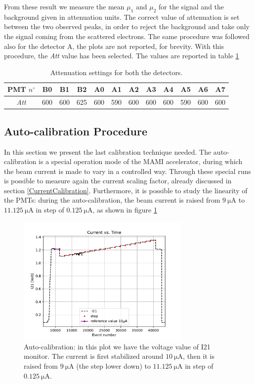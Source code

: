 From these result we measure the mean $\mu_{1}$ and $\mu_{2}$ for the signal and the background given in attenuation units. The correct value of attenuation is set between the two observed peaks, in order to reject the background and take only the signal coming from the scattered electrons. The same procedure was followed also for the detector A, the plots are not reported, for brevity.
With this procedure, the \textit{Att} value has been selected. The values are reported in table \ref{tab:AttSettings}

\begin{table}[ht]
\centering
\begin{tabular}{cccccccccccc}
PMT $n^{\circ}$& B0 & B1 & B2 & A0 & A1 & A2 & A3 & A4 & A5 & A6 & A7 \\
\hline
\textit{Att} & 600 & 600 & 625 & 600 & 590 & 600 & 600 & 600 & 590 & 600 & 600 \\
\end{tabular}
\caption{Attenuation settings for both the detectors.}
\label{tab:AttSettings}
\end{table}


\subsection{Auto-calibration Procedure} \label{Autocalib}

In this section we present the last calibration technique needed. The auto-calibration is a special operation mode of the MAMI accelerator, during which the beam current is made to vary in a controlled way. Through these special runs is possible to measure again the current scaling factor, already discussed in section \ref{CurrentCalibration}. Furthermore, it is possible to study the linearity of the PMTs: during the auto-calibration, the beam current is raised from $\SI{9}{\micro \ampere}$ to $\SI{11.125}{\micro \ampere}$ in step of $\SI{0.125}{\micro \ampere}$, as shown in figure \ref{fig:Autocalibration}

\begin{figure}[!ht]
\centering
\includegraphics[width = 0.75\textwidth]{Analysis/Autocalib/Current.pdf}
\caption{Auto-calibration: in this plot we have the voltage value of I21 monitor. The current is first stabilized around $\SI{10}{\micro \ampere}$, then it is raised from $\SI{9}{\micro \ampere}$ (the step lower down) to $\SI{11.125}{\micro \ampere}$ in step of $\SI{0.125}{\micro \ampere}$.}
\label{fig:Autocalibration}
\end{figure}

